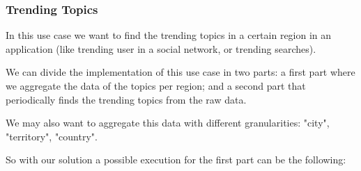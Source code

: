 \subsubsection{Trending Topics}
In this use case we want to find the trending topics in a certain region in an application (like trending user in a social network, or trending searches).

We can divide the implementation of this use case in two parts: a first part where we aggregate the data of the topics per region; and a second part that periodically finds the trending topics from the raw data.

We may also want to aggregate this data with different granularities: "city", "territory", "country".

So with our solution a possible execution for the first part can be the following:
